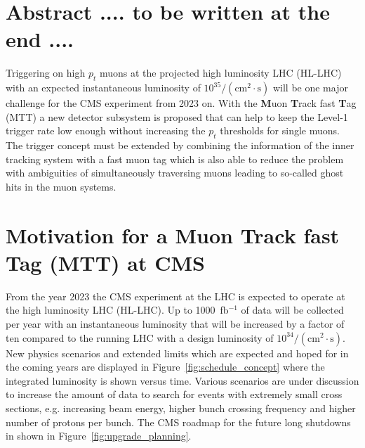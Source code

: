 \section{Abstract .... to be written at the end ....}
Triggering on high $p_t$ muons at the projected high luminosity LHC (HL-LHC) with an expected instantaneous luminosity of $10^{35}/(\mathrm{cm}^2 \cdot\mathrm{s})$ will be 
one major challenge for the CMS experiment from 2023 on. With the {\bf M}uon  {\bf T}rack fast {\bf T}ag (MTT) a new detector subsystem is proposed that can help to keep the 
Level-1 trigger rate low enough without increasing the $p_t$ thresholds for single muons. The trigger concept must be extended by combining the information of the inner tracking
system with a fast muon tag which is also able to reduce the problem with ambiguities of simultaneously traversing muons leading to so-called ghost hits in the muon systems. 

\section{Motivation for a Muon Track fast Tag (MTT) at CMS}

From the year 2023 the CMS experiment at the LHC is expected to operate at the high luminosity LHC (HL-LHC). Up to 1000~fb$^{-1}$ of data will be collected per year with an 
instantaneous luminosity that will be increased by a factor of ten compared to the running LHC with a design luminosity of $10^{34}/(\mathrm{cm}^2 \cdot\mathrm{s})$. New physics 
scenarios and extended limits which are expected and hoped for in the coming years are displayed in Figure~\ref{fig:schedule_concept} where the integrated luminosity is shown versus 
time. Various scenarios are under discussion to increase the amount of data to search for events with extremely small cross sections, e.g. increasing beam energy, higher bunch 
crossing frequency and higher number of protons per bunch. The CMS roadmap for the future long shutdowns in shown in Figure~\ref{fig:upgrade_planning}.

